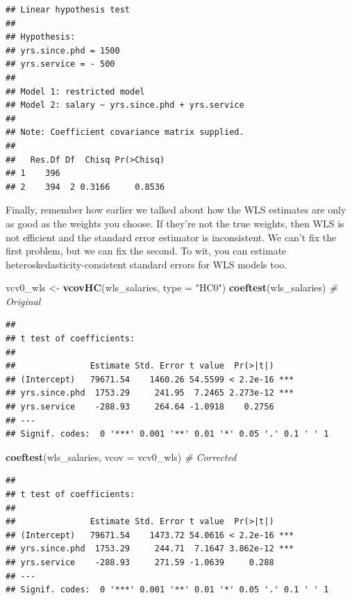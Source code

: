 \documentclass[
  12pt,
  oneside,openany]{book}
\newenvironment{Shaded}{\begin{snugshade}}{\end{snugshade}}
\newcommand{\CommentTok}[1]{\textcolor[rgb]{0.56,0.35,0.01}{\textit{#1}}}
\newcommand{\DataTypeTok}[1]{\textcolor[rgb]{0.13,0.29,0.53}{#1}}
\newcommand{\KeywordTok}[1]{\textcolor[rgb]{0.13,0.29,0.53}{\textbf{#1}}}
\newcommand{\NormalTok}[1]{#1}
\newcommand{\StringTok}[1]{\textcolor[rgb]{0.31,0.60,0.02}{#1}}
\begin{document}
\begin{verbatim}
## Linear hypothesis test
## 
## Hypothesis:
## yrs.since.phd = 1500
## yrs.service = - 500
## 
## Model 1: restricted model
## Model 2: salary ~ yrs.since.phd + yrs.service
## 
## Note: Coefficient covariance matrix supplied.
## 
##   Res.Df Df  Chisq Pr(>Chisq)
## 1    396                     
## 2    394  2 0.3166     0.8536
\end{verbatim}

Finally, remember how earlier we talked about how the WLS estimates are only as good as the weights you choose. If they're not the true weights, then WLS is not efficient and the standard error estimator is inconsistent. We can't fix the first problem, but we can fix the second. To wit, you can estimate heteroskedasticity-consistent standard errors for WLS models too.

\begin{Shaded}
\begin{Highlighting}[]
\NormalTok{vcv0\_wls \textless{}{-}}\StringTok{ }\KeywordTok{vcovHC}\NormalTok{(wls\_salaries, }\DataTypeTok{type =} \StringTok{"HC0"}\NormalTok{)}
\KeywordTok{coeftest}\NormalTok{(wls\_salaries)  }\CommentTok{\# Original}
\end{Highlighting}
\end{Shaded}

\begin{verbatim}
## 
## t test of coefficients:
## 
##               Estimate Std. Error t value  Pr(>|t|)    
## (Intercept)   79671.54    1460.26 54.5599 < 2.2e-16 ***
## yrs.since.phd  1753.29     241.95  7.2465 2.273e-12 ***
## yrs.service    -288.93     264.64 -1.0918    0.2756    
## ---
## Signif. codes:  0 '***' 0.001 '**' 0.01 '*' 0.05 '.' 0.1 ' ' 1
\end{verbatim}

\begin{Shaded}
\begin{Highlighting}[]
\KeywordTok{coeftest}\NormalTok{(wls\_salaries, }\DataTypeTok{vcov =}\NormalTok{ vcv0\_wls)  }\CommentTok{\# Corrected}
\end{Highlighting}
\end{Shaded}

\begin{verbatim}
## 
## t test of coefficients:
## 
##               Estimate Std. Error t value  Pr(>|t|)    
## (Intercept)   79671.54    1473.72 54.0616 < 2.2e-16 ***
## yrs.since.phd  1753.29     244.71  7.1647 3.862e-12 ***
## yrs.service    -288.93     271.59 -1.0639     0.288    
## ---
## Signif. codes:  0 '***' 0.001 '**' 0.01 '*' 0.05 '.' 0.1 ' ' 1
\end{verbatim}
\end{document}
